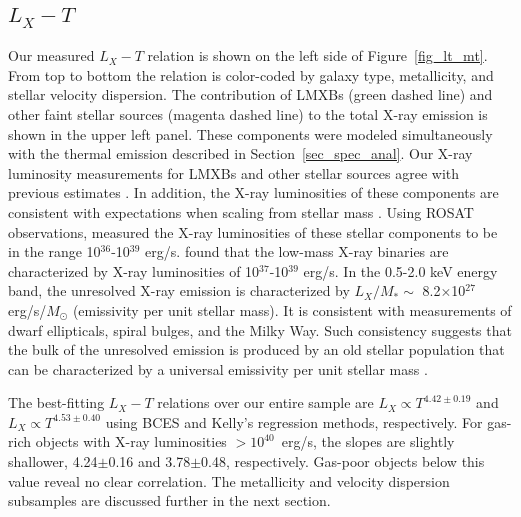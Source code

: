 \documentclass[iop]{emulateapj}
\begin{document}


\subsection{$L_X-T$}\label{sec_LT}

Our measured $L_X-T$ relation is shown on the left side of Figure~\ref{fig_lt_mt}. From top to bottom the relation is color-coded by galaxy type, metallicity, and stellar velocity dispersion. The contribution of LMXBs (green dashed line) and other faint stellar sources (magenta dashed line) to the total X-ray emission is shown in the upper left panel. These components were modeled simultaneously with the thermal emission described in Section~\ref{sec_spec_anal}. Our X-ray luminosity measurements for LMXBs and other stellar sources agree with previous estimates \citep{Irwin:96, Irwin:98, Revnivtsev:07a, Revnivtsev:07b, Boroson:10}. In addition, the X-ray luminosities of these components are consistent with expectations when scaling from stellar mass \citep{Revnivtsev:08a, Revnivtsev:08b}. Using ROSAT observations, \citet{Irwin:98} measured the X-ray luminosities of these stellar components to be in the range 10$^{36}$-10$^{39}$ erg/s. \citet{Revnivtsev:08a} found that the low-mass X-ray binaries are characterized by X-ray luminosities of 10$^{37}$-10$^{39}$ erg/s. In the 0.5-2.0 keV energy band, the unresolved X-ray emission is characterized by $L_X/M_{*} \sim $ 8.2$\times$10$^{27}$ erg/s/$M_{\odot}$ (emissivity per unit stellar mass). It is consistent with measurements of dwarf ellipticals, spiral bulges, and the Milky Way. Such consistency suggests that the bulk of the unresolved emission is produced by an old stellar population that can be characterized by a universal emissivity per unit stellar mass \citep[see][for more details]{Revnivtsev:08a}.

The best-fitting $L_X-T$ relations over our entire sample are $L_X \propto T^{4.42\pm0.19}$ and $L_X \propto T^{4.53\pm0.40}$ using BCES and Kelly's regression methods, respectively. For gas-rich objects with X-ray luminosities $>10^{40}$~erg/s, the slopes are slightly shallower, 4.24$\pm$0.16 and 3.78$\pm$0.48, respectively. Gas-poor objects below this value reveal no clear correlation. The metallicity and velocity dispersion subsamples are discussed further in the next section.
\end{document}
